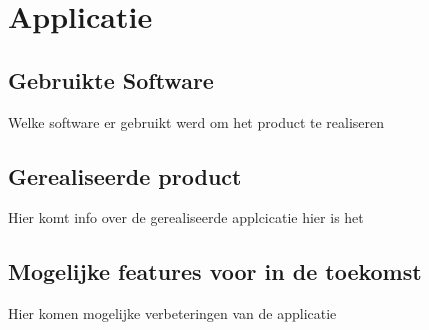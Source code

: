 \chapter{Applicatie}
\label{ch:applicatie}

\section{Gebruikte Software}
Welke software er gebruikt werd om het product te realiseren
\section{Gerealiseerde product}
Hier komt info over de gerealiseerde applcicatie
hier is het
\section{Mogelijke features voor in de toekomst}
Hier komen mogelijke verbeteringen van de applicatie 